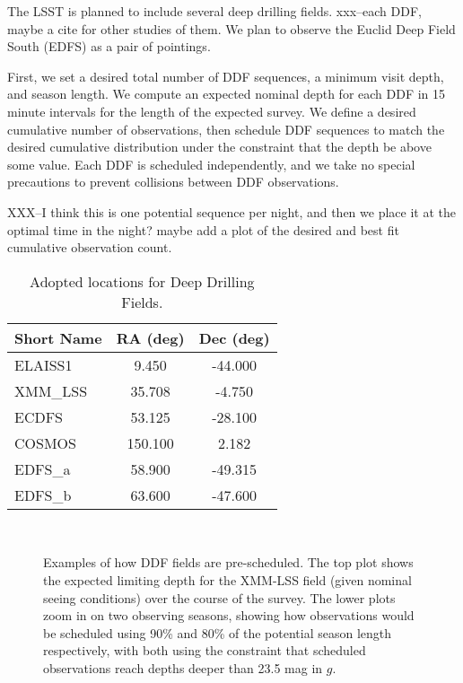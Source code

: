 \documentclass[]{aastex631}
\begin{document}
The LSST is planned to include several deep drilling fields. xxx--each DDF, maybe a cite for other studies of them. We plan to observe the Euclid Deep Field South (EDFS) as a pair of pointings. 

First, we set a desired total number of DDF sequences, a minimum visit depth, and season length. We compute an expected nominal depth for each DDF in 15 minute intervals for the length of the expected survey. We define a desired cumulative number of observations, then schedule DDF sequences to match the desired cumulative distribution under the constraint that the depth be above some value. Each DDF is scheduled independently, and we take no special precautions to prevent collisions between DDF observations. 

XXX--I think this is one potential sequence per night, and then we place it at the optimal time in the night? maybe add a plot of the desired and best fit cumulative observation count.



\begin{table}
    \centering
        \begin{tabular}{lcc}
        \toprule
        Short Name &      RA (deg) &     Dec (deg) \\
        \hline
           ELAISS1 &   9.450 & -44.000 \\
           XMM\_LSS &  35.708 &  -4.750 \\
             ECDFS &  53.125 & -28.100 \\
            COSMOS & 150.100 &   2.182 \\
            EDFS\_a &  58.900 & -49.315 \\
            EDFS\_b &  63.600 & -47.600 \\
        \hline
        \end{tabular}
    \caption{Adopted locations for Deep Drilling Fields.}
    \label{tab:ddf_loc}
\end{table}


\begin{figure}
    \\
    \caption{Examples of how DDF fields are pre-scheduled. The top plot shows the expected limiting depth for the XMM-LSS field (given nominal seeing conditions) over the course of the survey. The lower plots zoom in on two observing seasons, showing how observations would be scheduled using 90\% and 80\% of the potential season length respectively, with both using the constraint that scheduled observations reach depths deeper than 23.5 mag in $g$.}
    \label{fig:ddf_examples}
\end{figure}
\end{document}
